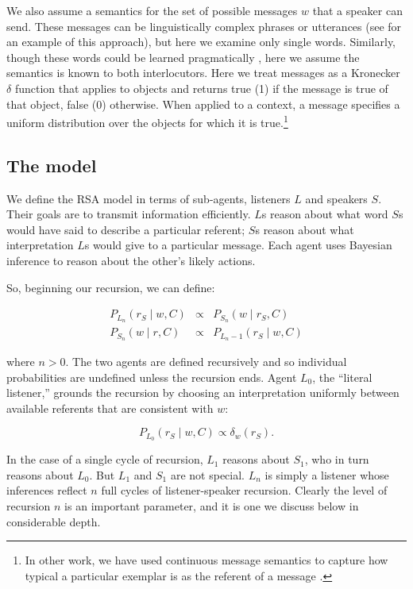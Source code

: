 \documentclass[man,noapacite]{apa2}
\begin{document}
We also assume a semantics for the set of possible messages $w$ that a speaker can send. These messages can be linguistically complex phrases or utterances (see  for an example of this approach), but here we examine only single words. Similarly, though these words could be learned pragmatically \cite{frank2014,smith2013}, here we assume the semantics is known to both interlocutors. Here we treat messages as a Kronecker $\delta$ function that applies to objects and returns {\sc true} (1) if the message is true of that object, {\sc false} (0) otherwise. When applied to a context, a message specifies a uniform distribution over the objects for which it is true.\footnote{In other work, we have used continuous message semantics to capture how typical a particular exemplar is as the referent of a message \cite{graf2016}.}

\subsection{The model}

We define the RSA model in terms of sub-agents, listeners $L$ and speakers $S$. Their goals are to transmit information efficiently. $L$s reason about what word $S$s would have said to describe a particular referent; $S$s reason about what interpretation $L$s would give to a particular message. Each agent uses Bayesian inference to reason about the other's likely actions.

So, beginning our recursion, we can define:

\begin{eqnarray}
    \label{eq:agents}
    P_{L_n}(r_S \mid w, C) & \propto  & P_{S_n} (w \mid r_S, C)\\
    P_{S_n}(w \mid r, C) & \propto & P_{L_n-1} (r_S \mid w, C)
\end{eqnarray}

\noindent where $n > 0$. The two agents are defined recursively and so individual probabilities are undefined unless the recursion ends. Agent $L_0$, the ``literal listener,'' grounds the recursion by choosing an interpretation uniformly between available referents that are consistent with $w$:

\begin{equation}
P_{L_0}(r_S \mid w, C) \propto \delta_w(r_S).
\end{equation}

In the case of a single cycle of recursion, $L_1$ reasons about $S_1$, who in turn reasons about $L_0$. But $L_1$ and $S_1$ are not special. $L_n$ is simply a listener whose inferences reflect $n$ full cycles of listener-speaker recursion. Clearly the level of recursion $n$ is an important parameter, and it is one we discuss below in considerable depth.
\end{document}
